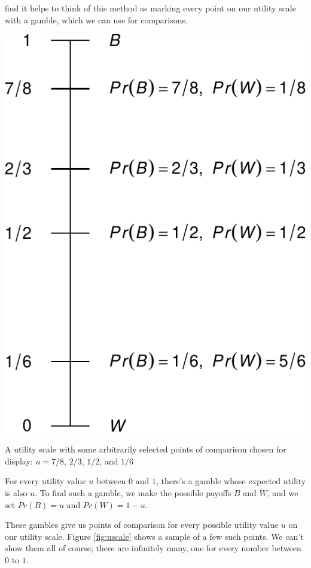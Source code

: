 \documentclass[justified]{tufte-book}
\newcommand{\p}{Pr}
\theoremstyle{definition}
\theoremstyle{definition}
\theoremstyle{definition}
\theoremstyle{remark}
\begin{document}
 find it helps to think of this method as marking every point on our utility scale with a gamble, which we can use for comparisons.

\begin{marginfigure}
\includegraphics{_main_files/figure-latex/uscale-1} \caption[A utility scale with some arbitrarily selected points of comparison chosen for display]{A utility scale with some arbitrarily selected points of comparison chosen for display: $u = 7/8$, $2/3$, $1/2$, and $1/6$}\label{fig:uscale}
\end{marginfigure}

For every utility value \(u\) between \(0\) and \(1\), there's a gamble whose expected utility is also \(u\). To find such a gamble, we make the possible payoffs \(B\) and \(W\), and we set \(\p(B) = u\) and \(\p(W) = 1 - u\).

These gambles give us points of comparison for every possible utility value \(u\) on our utility scale. Figure \ref{fig:uscale} shows a sample of a few such points. We can't show them all of course; there are infinitely many, one for every number between \(0\) to \(1\).
\end{document}
